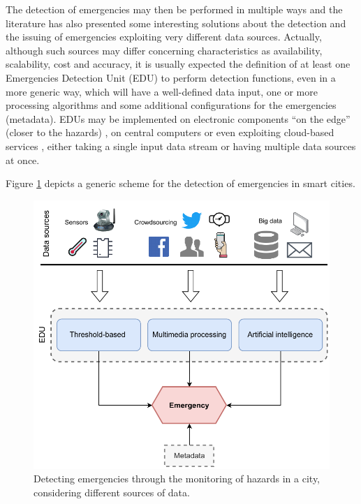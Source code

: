 \begin{refsection}
The detection of emergencies may then be performed in multiple ways and the literature has also presented some interesting solutions about the detection and the issuing of emergencies exploiting very different data sources. Actually, although such sources may differ concerning characteristics as availability, scalability, cost and accuracy, it is usually expected the definition of at least one Emergencies Detection Unit (EDU) to perform detection functions, even in a more generic way, which will have a well-defined data input, one or more processing algorithms and some additional configurations for the emergencies (metadata). EDUs may be implemented on electronic components ``on the edge'' (closer to the hazards) \cite{PlatformsSC,sensorsplatforms}, on central computers \cite{twitterDetection2,centralserver1} or even exploiting cloud-based services \cite{cloud1}, either taking a single input data stream or having multiple data sources at once. 

Figure \ref{Fig:detection} depicts a generic scheme for the detection of emergencies in smart cities. 

\begin{figure}[ht]
\centering
\includegraphics[scale=0.6]{Chapters/1-Survey/images/detection.pdf}
\caption{Detecting emergencies through the monitoring of hazards in a city, considering different sources of data.}
\label{Fig:detection}
\end{figure}


\end{refsection}
